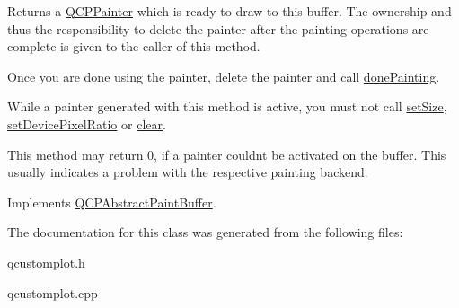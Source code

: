 Returns a \hyperlink{classQCPPainter}{Q\+C\+P\+Painter} which is ready to draw to this buffer. The ownership and thus the responsibility to delete the painter after the painting operations are complete is given to the caller of this method.

Once you are done using the painter, delete the painter and call \hyperlink{classQCPAbstractPaintBuffer_a41b0dc6e7744f19fae09f8532c207dc1}{done\+Painting}.

While a painter generated with this method is active, you must not call \hyperlink{classQCPAbstractPaintBuffer_a8b68c3cd36533f1a4a23b5ce8cd66f01}{set\+Size}, \hyperlink{classQCPAbstractPaintBuffer_a555eaad5d5c806420ff35602a1bb68fa}{set\+Device\+Pixel\+Ratio} or \hyperlink{classQCPPaintBufferPixmap_a14badbd010a3cde6b55817ccb7b65217}{clear}.

This method may return 0, if a painter couldn\textquotesingle{}t be activated on the buffer. This usually indicates a problem with the respective painting backend. 

Implements \hyperlink{classQCPAbstractPaintBuffer_a9e9f29b19c033cf02fb96f1a148463f3}{Q\+C\+P\+Abstract\+Paint\+Buffer}.



The documentation for this class was generated from the following files\+:\begin{DoxyCompactItemize}
\item 
qcustomplot.\+h\item 
qcustomplot.\+cpp\end{DoxyCompactItemize}
